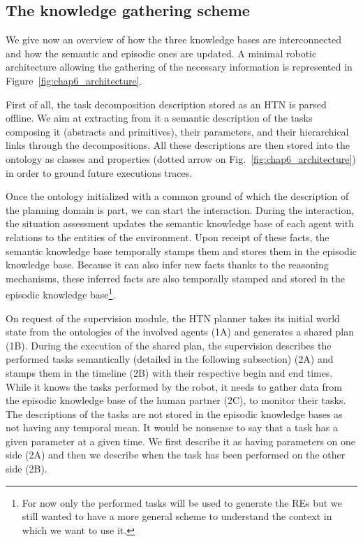 \subsection{The knowledge gathering scheme}

We give now an overview of how the three knowledge bases are interconnected and how the semantic and episodic ones are updated. A minimal robotic architecture allowing the gathering of the necessary information is represented in Figure~\ref{fig:chap6_architecture}.

First of all, the task decomposition description stored as an HTN is parsed offline. We aim at extracting from it a semantic description of the tasks composing it (abstracts and primitives), their parameters, and their hierarchical links through the decompositions. All these descriptions are then stored into the ontology as classes and properties (dotted arrow on Fig.~\ref{fig:chap6_architecture}) in order to ground future executions traces.

Once the ontology initialized with a common ground of which the description of the planning domain is part, we can start the interaction. During the interaction, the situation assessment updates the semantic knowledge base of each agent with relations to the entities of the environment. Upon receipt of these facts, the semantic knowledge base temporally stamps them and stores them in the episodic knowledge base. Because it can also infer new facts thanks to the reasoning mechanisms, these inferred facts are also temporally stamped and stored in the episodic knowledge base\footnote{For now only the performed tasks will be used to generate the REs but we still wanted to have a more general scheme to understand the context in which we want to use it.}.

On request of the supervision module, the HTN planner takes its initial world state from the ontologies of the involved agents (1A) and generates a shared plan (1B). During the execution of the shared plan, the supervision describes the performed tasks semantically (detailed in the following subsection) (2A) and stamps them in the timeline (2B) with their respective begin and end times. While it knows the tasks performed by the robot, it needs to gather data from the episodic knowledge base of the human partner (2C), to monitor their tasks. The descriptions of the tasks are not stored in the episodic knowledge bases as not having any temporal mean. It would be nonsense to say that a task has a given parameter at a given time. We first describe it as having parameters on one side (2A) and then we describe when the task has been performed on the other side (2B). 

